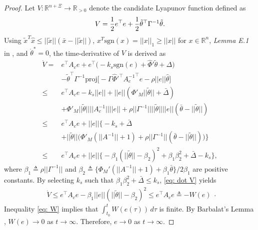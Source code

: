 \documentclass[letterpaper, 10 pt, conference]{ieeeconf}  %
\begin{document}
\begin{proof}
Let $V:\mathbb{R}^{n+\Xi}\to\mathbb{R}_{>0}$ denote the candidate Lyapunov function defined as 
\begin{equation}
    V={1\over2}e^\top e+{1\over 2}\tilde \theta^\top  \Gamma^{-1}\tilde \theta.
\end{equation}
Using $\tilde x^T\hat x\le||\tilde x||(\bar  x - ||\tilde x||)$, $x^T\text{sgn}(x)=||x||_1\ge ||x||$ for $x\in\mathbb{R}^n$, \textit{Lemma E.1} in \cite{BookProjection}, and $\dot \theta^*=0$, the time-derivative of $V$ is derived as 
\begin{equation}
    \begin{aligned}
        \dot V 
        =
        &
        e^\top  A_c e + 
        e^\top   
        \bigg( -k_s\text{sgn}(e)+\hat\Phi'\tilde \theta+\Delta
        \bigg)
        \\
        &-\tilde\theta^\top   \Gamma^{-1} 
        \text{proj}
        \bigg[
            -\Gamma  \hat\Phi'^\top  {A_c^{-1}}^\top  e
            - \rho||e|| \hat \theta
        \bigg]
\\
\le &
        e^\top  A_c e -k_s ||e|| + ||e|| (\Phi'_M ||\tilde \theta||  +\bar\Delta ) 
\\      
        & + \Phi'_M ||\tilde \theta||   ||A_c^{-1}|| ||e|| 
        +   \rho||\Gamma^{-1}||||\tilde\theta|| ||e|| (\bar\theta - ||\tilde \theta||)
\\
\le&
        e^\top  A_c e 
        +||e|| \bigg\{ 
         -k_s+        \bar\Delta
\\
        &
        +||\tilde \theta|| \bigg(\Phi'_M (||A^{-1}||+1) + \rho||\Gamma^{-1}|| (\bar\theta - ||\tilde \theta||) \bigg)
        \bigg\}
\\
\le&
        e^\top  A_c e +
        ||e|| 
        \bigg\{
         -\beta_1(||\tilde \theta ||-\beta_2)^2 + \beta_1\beta_2^2 + \bar\Delta -k_s 
        \bigg\},
       \end{aligned}
       \label{eq: dot V}
\end{equation}
where $\beta_1\triangleq\rho||\Gamma^{-1}||$ and $\beta_2 \triangleq \{\Phi_M' (||A^{-1}||+1) + \beta_1\bar\theta\}/2\beta_1$ are positive constants.
By selecting $k_s$ such that $\beta_1\beta_2^2+\bar\Delta \le k_s $, \eqref{eq: dot V} yields 
\begin{equation}
    \begin{aligned}
        \dot V \le e^\top  A_c e  -\beta_1||e||(||\tilde\theta||-\beta_2)^2\le
        e^\top  A_c e \triangleq -W(e) 
    \end{aligned}.\label{eq: W}
\end{equation}
Inequality \eqref{eq: W} implies that $\int_{{t_0}}^t {W(e(\tau ))} \,d\tau $ is finite. By Barbalat's Lemma \cite{Khalil}, $W(e) \to 0$ as $t \to \infty$. Therefore, $e\to 0$ as $t\to\infty$. 
\end{proof}
\end{document}
